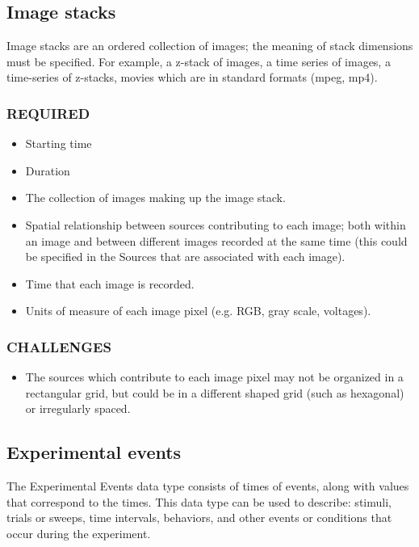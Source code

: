 \documentclass[letterpaper, 10 pt, conference]{ieeeconf}  \IEEEoverridecommandlockouts                              \overrideIEEEmargins
\begin{document}
\subsection{Image stacks}
Image stacks are an ordered collection of images; the meaning of stack dimensions must be specified.  For example, a z-stack of images, a time series of images, a time-series of z-stacks, movies which are in standard formats (mpeg, mp4).
\smallskip
\subsubsection*{REQUIRED}
\begin{itemize}
\item Starting time
\item Duration
\item The collection of images making up the image stack.
\item Spatial relationship between sources contributing to each image; both within an image and between different images recorded at the same time (this could be specified in the Sources that are associated with each image).
\item Time that each image is recorded.
\item Units of measure of each image pixel (e.g. RGB, gray scale, voltages).
\end{itemize}
\smallskip
\subsubsection*{CHALLENGES}
\begin{itemize}
\item The sources which contribute to each image pixel may not be organized in a rectangular grid, but could be in a different shaped grid (such as hexagonal) or irregularly spaced.
\end{itemize}

\subsection{Experimental events}
The Experimental Events data type consists of times of events, along with values that correspond to the times.   This data type can be used to describe: stimuli, trials or sweeps, time intervals, behaviors, and other events or conditions that occur during the experiment.
\smallskip
\end{document}
